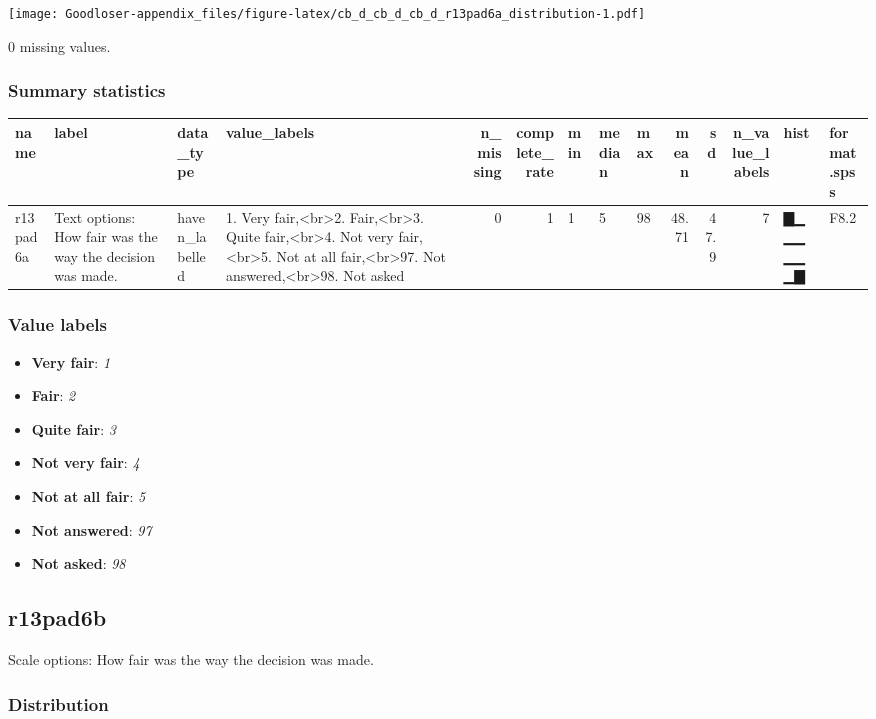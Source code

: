 \documentclass[
]{book}
\providecommand{\tightlist}{%
  \setlength{\itemsep}{0pt}\setlength{\parskip}{0pt}}
\begin{document}
\texttt{[image: Goodloser-appendix\_files/figure-latex/cb\_d\_cb\_d\_cb\_d\_r13pad6a\_distribution-1.pdf]}

0 missing values.

\hypertarget{r13pad6a_summary}{%
\subsubsection{Summary statistics}\label{r13pad6a_summary}}

\begin{tabular}{l|l|l|l|r|r|l|l|l|r|r|r|l|l}
\hline
name & label & data_type & value_labels & n_missing & complete_rate & min & median & max & mean & sd & n_value_labels & hist & format.spss\\
\hline
r13pad6a & Text options: How fair was the way the decision was made. & haven_labelled & 1. Very fair,<br>2. Fair,<br>3. Quite fair,<br>4. Not very fair,<br>5. Not at all fair,<br>97. Not answered,<br>98. Not asked & 0 & 1 & 1 & 5 & 98 & 48.71 & 47.9 & 7 & ▇▁▁▁▁▁▁▇ & F8.2\\
\hline
\end{tabular}

\hypertarget{r13pad6a_labels}{%
\subsubsection{Value labels}\label{r13pad6a_labels}}

\begin{itemize}
\tightlist
\item
  \textbf{Very fair}: \emph{1}
\item
  \textbf{Fair}: \emph{2}
\item
  \textbf{Quite fair}: \emph{3}
\item
  \textbf{Not very fair}: \emph{4}
\item
  \textbf{Not at all fair}: \emph{5}
\item
  \textbf{Not answered}: \emph{97}
\item
  \textbf{Not asked}: \emph{98}
\end{itemize}

\hypertarget{r13pad6b}{%
\subsection{r13pad6b}\label{r13pad6b}}

Scale options: How fair was the way the decision was made.

\hypertarget{r13pad6b_distribution}{%
\subsubsection{Distribution}\label{r13pad6b_distribution}}
\end{document}
